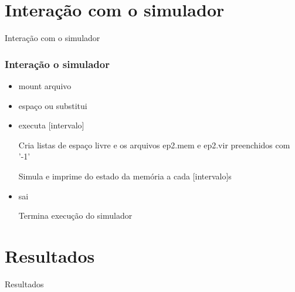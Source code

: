 \documentclass{beamer}
\begin{document}
\section{Interação com o simulador}
\begin{frame}
\begin{LARGE}
\begin{center}
Interação com o simulador
\end{center}
\end{LARGE}
\end{frame}


\begin{frame}
\frametitle{Interação o simulador}


\begin{itemize}
\item mount arquivo 

\item espaço ou substitui

\end{itemize}
\end{frame}



\begin{frame}

\begin{itemize}
\frametitle{Interação o simulador}
\item executa [intervalo]

  Cria listas de espaço livre e os arquivos ep2.mem e ep2.vir preenchidos com '-1'
  
  Simula e imprime do estado da memória a cada [intervalo]s
  
\item sai

  Termina execução do simulador  

\end{itemize}
\end{frame}



\section{Resultados} 
\begin{frame}
\begin{LARGE}
\begin{center}
Resultados
\end{center}
\end{LARGE}
\end{frame}
\end{document}
